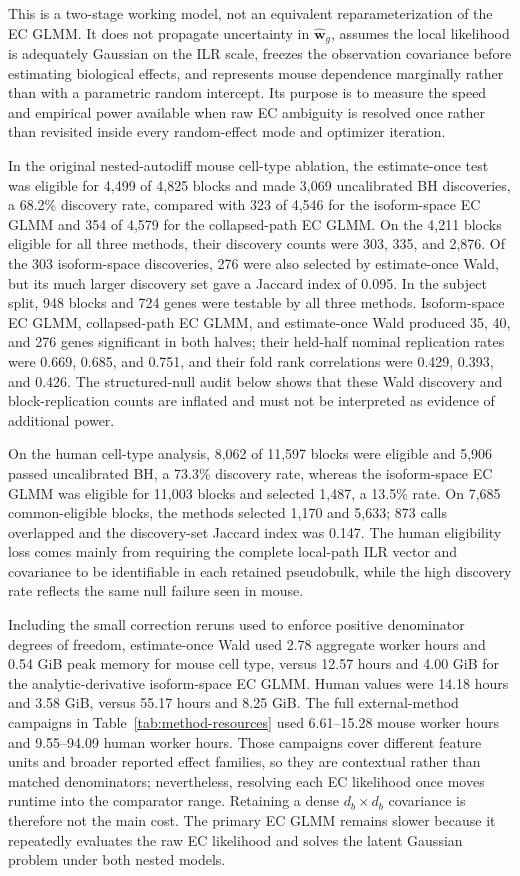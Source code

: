 \documentclass[11pt]{article}
\begin{document}
This is a two-stage working model, not an equivalent reparameterization of the EC GLMM. It does not propagate uncertainty in \(\widehat{\bm w}_g\), assumes the local likelihood is adequately Gaussian on the ILR scale, freezes the observation covariance before estimating biological effects, and represents mouse dependence marginally rather than with a parametric random intercept. Its purpose is to measure the speed and empirical power available when raw EC ambiguity is resolved once rather than revisited inside every random-effect mode and optimizer iteration.

In the original nested-autodiff mouse cell-type ablation, the estimate-once test was eligible for 4,499 of 4,825 blocks and made 3,069 uncalibrated BH discoveries, a 68.2\% discovery rate, compared with 323 of 4,546 for the isoform-space EC GLMM and 354 of 4,579 for the collapsed-path EC GLMM. On the 4,211 blocks eligible for all three methods, their discovery counts were 303, 335, and 2,876. Of the 303 isoform-space discoveries, 276 were also selected by estimate-once Wald, but its much larger discovery set gave a Jaccard index of 0.095. In the subject split, 948 blocks and 724 genes were testable by all three methods. Isoform-space EC GLMM, collapsed-path EC GLMM, and estimate-once Wald produced 35, 40, and 276 genes significant in both halves; their held-half nominal replication rates were 0.669, 0.685, and 0.751, and their fold rank correlations were 0.429, 0.393, and 0.426. The structured-null audit below shows that these Wald discovery and block-replication counts are inflated and must not be interpreted as evidence of additional power.

On the human cell-type analysis, 8,062 of 11,597 blocks were eligible and 5,906 passed uncalibrated BH, a 73.3\% discovery rate, whereas the isoform-space EC GLMM was eligible for 11,003 blocks and selected 1,487, a 13.5\% rate. On 7,685 common-eligible blocks, the methods selected 1,170 and 5,633; 873 calls overlapped and the discovery-set Jaccard index was 0.147. The human eligibility loss comes mainly from requiring the complete local-path ILR vector and covariance to be identifiable in each retained pseudobulk, while the high discovery rate reflects the same null failure seen in mouse.

Including the small correction reruns used to enforce positive denominator degrees of freedom, estimate-once Wald used 2.78 aggregate worker hours and 0.54 GiB peak memory for mouse cell type, versus 12.57 hours and 4.00 GiB for the analytic-derivative isoform-space EC GLMM. Human values were 14.18 hours and 3.58 GiB, versus 55.17 hours and 8.25 GiB. The full external-method campaigns in Table~\ref{tab:method-resources} used 6.61--15.28 mouse worker hours and 9.55--94.09 human worker hours. Those campaigns cover different feature units and broader reported effect families, so they are contextual rather than matched denominators; nevertheless, resolving each EC likelihood once moves runtime into the comparator range. Retaining a dense \(d_b\times d_b\) covariance is therefore not the main cost. The primary EC GLMM remains slower because it repeatedly evaluates the raw EC likelihood and solves the latent Gaussian problem under both nested models.
\end{document}
